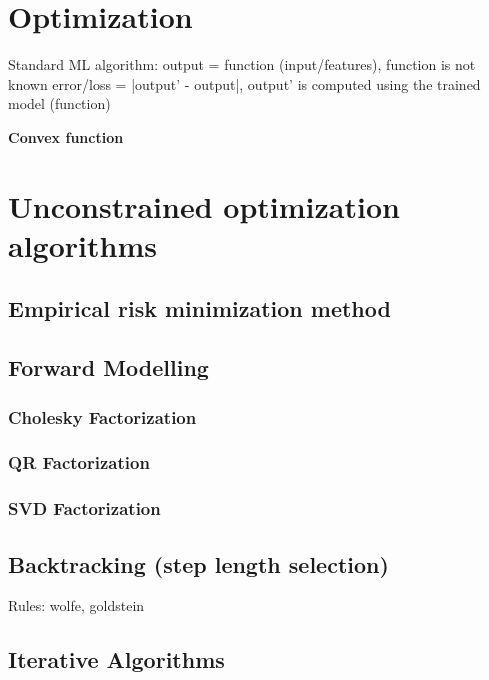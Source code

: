\documentclass[11pt]{article}
\begin{document}
\section{Optimization}
\label{sec:orga6c427b}
Standard ML algorithm: output = function (input/features), function is not known
error/loss = |output' - output|, output' is computed using the trained model (function)

\textbf{Convex function}

\section{Unconstrained optimization algorithms}
\label{sec:org0bcc8b6}
\subsection{Empirical risk minimization method}
\label{sec:orgb0bc7c3}
\subsection{Forward Modelling}
\label{sec:org950d2fd}
\subsubsection{Cholesky Factorization}
\label{sec:org5136faa}
\subsubsection{QR Factorization}
\label{sec:org77885c5}
\subsubsection{SVD Factorization}
\label{sec:org3dd4adc}
\subsection{Backtracking (step length selection)}
\label{sec:orgccad2d9}
Rules: wolfe, goldstein
\subsection{Iterative Algorithms}
\label{sec:org679853f}
\end{document}
